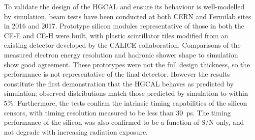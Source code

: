 To validate the design of the HGCAL and ensure its behaviour is well-modelled by simulation, beam tests have been conducted at both CERN and Fermilab sites in 2016 and 2017. 
Prototype silicon modules representative of those in both the CE-E and CE-H were built, with plastic scintillator tiles modified from an existing detector developed by the CALICE collaboration.
Comparisons of the measured electron energy resolution and hadronic shower shape to simulation show good agreement.
These prototypes were not the full design thickness, so the performance is not representative of the final detector.
However the results constitute the first demonstration that the HGCAL behaves as predicted by simulation; observed distributions match those predicted by simulation to within 5\%. 
Furthermore, the tests confirm the intrinsic timing capabilities of the silicon sensors, with timing resolution measured to be less than \SI{30}{\pico\second}.
The timing performance of the silicon was also confirmed to be a function of S/N only, and not degrade with increasing radiation exposure. 
